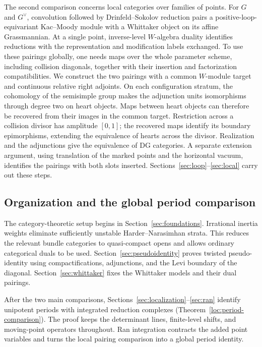 \documentclass[11pt]{article}
\numberwithin{equation}{section}
\theoremstyle{definition}
\theoremstyle{remark}
\begin{document}
The second comparison concerns local categories over families of points.
For $G$ and $G^\vee$, convolution followed by Drinfeld--Sokolov
reduction pairs a positive-loop-equivariant Kac--Moody module with a
Whittaker object on its affine Grassmannian. At a single point,
inverse-level $W$-algebra duality identifies reductions with the
representation and modification labels exchanged. To use these pairings
globally, one needs maps over the
whole parameter scheme, including collision diagonals, together with
their insertion and factorization compatibilities. We construct the two
pairings with a common $W$-module target and continuous relative right
adjoints. On each configuration stratum, the cohomology of the
semisimple group makes the adjunction units isomorphisms through degree
two on heart objects. Maps between heart objects can therefore be
recovered from their images in the common target. Restriction across a
collision divisor has amplitude $[0,1]$; the recovered maps identify its
boundary epimorphisms, extending the equivalence of hearts across the
divisor. Realization and the adjunctions give the equivalence of DG
categories. A separate extension argument, using translation of the
marked points and the horizontal vacuum, identifies the pairings with
both slots inserted. Sections~\ref{sec:loop}--\ref{sec:local} carry out
these steps.

\subsection{Organization and the global period comparison}

The category-theoretic setup begins in Section~\ref{sec:foundations}.
Irrational inertia weights eliminate sufficiently unstable
Harder--Narasimhan strata. This reduces the relevant bundle categories
to quasi-compact opens and allows ordinary categorical duals to be used.
Section~\ref{sec:pseudoidentity} proves twisted pseudo-identity using
compactifications, adjunctions, and the Levi boundary of the diagonal.
Section~\ref{sec:whittaker} fixes the Whittaker models and their dual
pairings.

After the two main comparisons, Sections~\ref{sec:localization}--\ref{sec:ran}
identify unipotent periods with integrated reduction complexes
(Theorem~\ref{loc:period-comparison}). The
proof keeps the determinant lines, finite-level shifts, and moving-point
operators throughout. Ran integration contracts the added point
variables and turns the local pairing comparison into a global period
identity.
\end{document}
